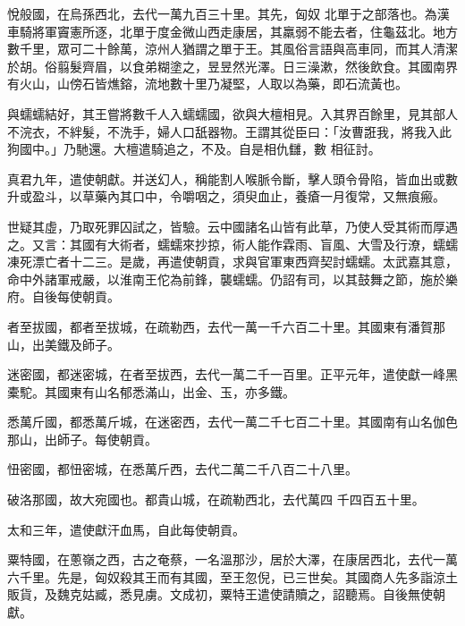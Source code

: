 \begin{pinyinscope}
 悅般國，在烏孫西北，去代一萬九百三十里。其先，匈奴
 北單于之部落也。為漢車騎將軍竇憲所逐，北單于度金微山西走康居，其羸弱不能去者，住龜茲北。地方數千里，眾可二十餘萬，涼州人猶謂之單于王。其風俗言語與高車同，而其人清潔於胡。俗翦髮齊眉，以食弟糊塗之，昱昱然光澤。日三澡漱，然後飲食。其國南界有火山，山傍石皆燋鎔，流地數十里乃凝堅，人取以為藥，即石流黃也。



 與蠕蠕結好，其王嘗將數千人入蠕蠕國，欲與大檀相見。入其界百餘里，見其部人不浣衣，不絆髮，不洗手，婦人口舐器物。王謂其從臣曰：「汝曹誑我，將我入此狗國中。」乃馳還。大檀遣騎追之，不及。自是相仇讎，數
 相征討。



 真君九年，遣使朝獻。并送幻人，稱能割人喉脈令斷，擊人頭令骨陷，皆血出或數升或盈斗，以草藥內其口中，令嚼咽之，須臾血止，養瘡一月復常，又無痕瘢。



 世疑其虛，乃取死罪囚試之，皆驗。云中國諸名山皆有此草，乃使人受其術而厚遇之。又言：其國有大術者，蠕蠕來抄掠，術人能作霖雨、盲風、大雪及行潦，蠕蠕凍死漂亡者十二三。是歲，再遣使朝貢，求與官軍東西齊契討蠕蠕。太武嘉其意，命中外諸軍戒嚴，以淮南王佗為前鋒，襲蠕蠕。仍詔有司，以其鼓舞之節，施於樂府。自後每使朝貢。



 者至拔國，都者至拔城，在疏勒西，去代一萬一千六百二十里。其國東有潘賀那山，出美鐵及師子。



 迷密國，都迷密城，在者至拔西，去代一萬二千一百里。正平元年，遣使獻一峰黑橐駝。其國東有山名郁悉滿山，出金、玉，亦多鐵。



 悉萬斤國，都悉萬斤城，在迷密西，去代一萬二千七百二十里。其國南有山名伽色那山，出師子。每使朝貢。



 忸密國，都忸密城，在悉萬斤西，去代二萬二千八百二十八里。



 破洛那國，故大宛國也。都貴山城，在疏勒西北，去代萬四
 千四百五十里。



 太和三年，遣使獻汗血馬，自此每使朝貢。



 粟特國，在蔥嶺之西，古之奄蔡，一名溫那沙，居於大澤，在康居西北，去代一萬六千里。先是，匈奴殺其王而有其國，至王忽倪，已三世矣。其國商人先多詣涼土販貨，及魏克姑臧，悉見虜。文成初，粟特王遣使請贖之，詔聽焉。自後無使朝獻。




\end{pinyinscope}
